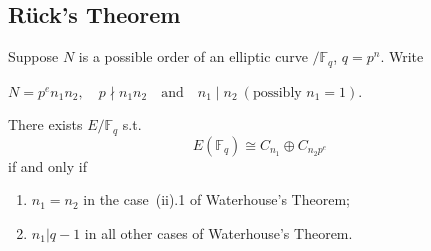 \documentclass[10pt,final]{beamer} %
\newcommand{\F}{\mathbb F}
\theoremstyle{definition}
\begin{document}
\begin{frame}[label=current]
\end{frame}

\subsection{R\"uck's Theorem}
\begin{frame}
\begin{theorem}[R\"uck]
Suppose $N$ is a possible order of an elliptic curve $/\F_q$,  $q=p^n$.  Write

\centerline{
$N = p^e n_1 n_2,\quad p\nmid n_1 n_2\quad\text{and}\quad n_1\mid n_2\ (\text{possibly }n_1 = 1).$}

There exists $E/\F_q$ s.t.
$$E(\F_q)\cong C_{n_1}\oplus C_{n_2p^e}$$
if and only if
\begin{enumerate}[<+-| alert@+>]
\item $n_1 = n_2$ in the case~(ii).1 of Waterhouse's Theorem;
\item $n_1 |q - 1$ in all other cases of  Waterhouse's Theorem.
\end{enumerate}
\end{theorem}\pause

\begin{example}
\end{example}
\end{frame}
\end{document}
